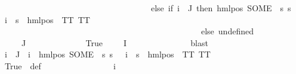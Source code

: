 \begin{isabellebody}
\ \ \ \ \ \ \ \ \ \ \ \ \ \ \ \ \ \ \ \ \ \ \ \ \ \ \ \ \ \ \ \ \ \ \ \ else\ {\isacharparenleft}{\kern0pt}if\ i\ {\isasymin}\ J\ then\ {\isacharparenleft}{\kern0pt}hml{\isacharunderscore}{\kern0pt}pos\ {\isacharparenleft}{\kern0pt}SOME\ {\isasymalpha}{\isachardot}{\kern0pt}\ {\isacharparenleft}{\kern0pt}{\isasymforall}s{\isachardot}{\kern0pt}\ {\isacharparenleft}{\kern0pt}s\ {\isasymTurnstile}\ {\isasymPhi}\ i{\isacharparenright}{\kern0pt}\ {\isasymlongleftrightarrow}\ {\isacharparenleft}{\kern0pt}s\ {\isasymTurnstile}\ {\isacharparenleft}{\kern0pt}hml{\isacharunderscore}{\kern0pt}pos\ {\isasymalpha}\ TT{\isacharparenright}{\kern0pt}{\isacharparenright}{\kern0pt}{\isacharparenright}{\kern0pt}{\isacharparenright}{\kern0pt}\ TT{\isacharparenright}{\kern0pt}\ \ \isanewline
\ \ \ \ \ \ \ \ \ \ \ \ \ \ \ \ \ \ \ \ \ \ \ \ \ \ \ \ \ \ \ \ \ \ \ \ \ \ \ \ \ \ \ \ \ \ \ \ else\ undefined{\isacharparenright}{\kern0pt}{\isacharparenright}{\kern0pt}{\isacharparenright}{\kern0pt}{\isachardoublequoteclose}\isanewline
\ \ \ \ \ \ \ \ \ \ \isamarkupfalse%
\ {\isachardoublequoteopen}{\isasymphi}\ {\isasymnotin}\ {\isasymPhi}\ {\isacharbackquote}{\kern0pt}\ J{\isachardoublequoteclose}\isanewline
\ \ \ \ \ \ \ \ \ \ \ \ \isamarkupfalse%
\ True\ {\isacartoucheopen}{\isasymphi}\ {\isasymin}\ {\isasymPhi}\ {\isacharbackquote}{\kern0pt}\ I{\isacartoucheclose}\ \isanewline
\ \ \ \ \ \ \ \ \ \ \ \ \isamarkupfalse%
\ blast\isanewline
\ \ \ \ \ \ \ \ \ \ \isamarkupfalse%
\ {\isachardoublequoteopen}{\isasymforall}i\ {\isasymin}\ J{\isachardot}{\kern0pt}\ {\isasymPsi}\ i\ {\isacharequal}{\kern0pt}\ {\isacharparenleft}{\kern0pt}hml{\isacharunderscore}{\kern0pt}pos\ {\isacharparenleft}{\kern0pt}SOME\ {\isasymalpha}{\isachardot}{\kern0pt}\ {\isacharparenleft}{\kern0pt}{\isasymforall}s{\isachardot}{\kern0pt}\ {\isacharparenleft}{\kern0pt}s\ {\isasymTurnstile}\ {\isasymPhi}\ i{\isacharparenright}{\kern0pt}\ {\isasymlongleftrightarrow}\ {\isacharparenleft}{\kern0pt}s\ {\isasymTurnstile}\ {\isacharparenleft}{\kern0pt}hml{\isacharunderscore}{\kern0pt}pos\ {\isasymalpha}\ TT{\isacharparenright}{\kern0pt}{\isacharparenright}{\kern0pt}{\isacharparenright}{\kern0pt}{\isacharparenright}{\kern0pt}\ TT{\isacharparenright}{\kern0pt}{\isachardoublequoteclose}\isanewline
\ \ \ \ \ \ \ \ \ \ \ \ \isamarkupfalse%
\ True\ {\isachardoublequoteopen}{}{\isachardoublequoteclose}\ {\isasymPsi}{\isacharunderscore}{\kern0pt}def\ \ \isanewline
\ \ \ \ \ \ \ \ \ \ \ \ \isamarkupfalse%
\ {\isacartoucheopen}{\isasymPhi}\ i{\isacharunderscore}{\kern0pt}{\isasymphi}\ {\isacharequal}{\kern0pt}\ {\isasymphi}{\isacartoucheclose}\ \isamarkupfalse%

\end{isabellebody}

